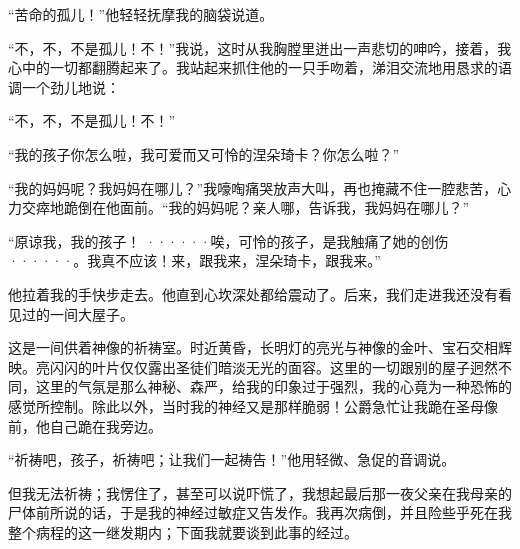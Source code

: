 \documentclass[12pt, UTF8]{ctexbook}
\begin{document}
\par “苦命的孤儿！”他轻轻抚摩我的脑袋说道。
\par “不，不，不是孤儿！不！”我说，这时从我胸膛里迸出一声悲切的呻吟，接着，我心中的一切都翻腾起来了。我站起来抓住他的一只手吻着，涕泪交流地用恳求的语调一个劲儿地说：
\par “不，不，不是孤儿！不！”
\par “我的孩子你怎么啦，我可爱而又可怜的涅朵琦卡？你怎么啦？”
\par “我的妈妈呢？我妈妈在哪儿？”我嚎啕痛哭放声大叫，再也掩藏不住一腔悲苦，心力交瘁地跪倒在他面前。“我的妈妈呢？亲人哪，告诉我，我妈妈在哪儿？”
\par “原谅我，我的孩子！ ······唉，可怜的孩子，是我触痛了她的创伤······。我真不应该！来，跟我来，涅朵琦卡，跟我来。”
\par 他拉着我的手快步走去。他直到心坎深处都给震动了。后来，我们走进我还没有看见过的一间大屋子。
\par 这是一间供着神像的祈祷室。时近黄昏，长明灯的亮光与神像的金叶、宝石交相辉映。亮闪闪的叶片仅仅露出圣徒们暗淡无光的面容。这里的一切跟别的屋子迥然不同，这里的气氛是那么神秘、森严，给我的印象过于强烈，我的心竟为一种恐怖的感觉所控制。除此以外，当时我的神经又是那样脆弱！公爵急忙让我跪在圣母像前，他自己跪在我旁边。
\par “祈祷吧，孩子，祈祷吧；让我们一起祷告！”他用轻微、急促的音调说。
\par 但我无法祈祷；我愣住了，甚至可以说吓慌了，我想起最后那一夜父亲在我母亲的尸体前所说的话，于是我的神经过敏症又告发作。我再次病倒，并且险些乎死在我整个病程的这一继发期内；下面我就要谈到此事的经过。
\end{document}
